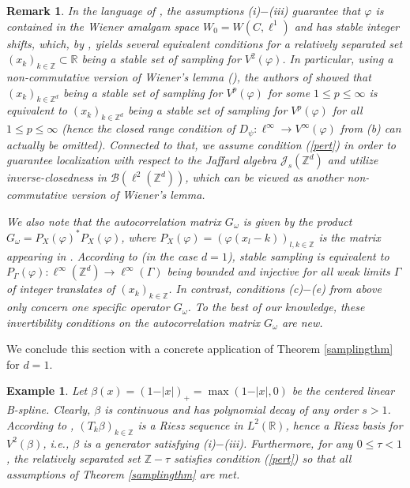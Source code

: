 \documentclass{amsart}
\newtheorem{example}[theorem]{Example}
\newtheorem{rem.}[theorem]{Remark}
\newcommand{\B}[0]{{\mathcal{B}}}
\newcommand{\Z}[0]{{\mathbb{Z}}}
\newcommand{\J}[0]{{\mathcal{J}}}
\begin{document}
\begin{rem.}
In the language of \cite{grrost18}, the assumptions (i)$-$(iii) guarantee that $\varphi$ is contained in the Wiener amalgam space $W_0 = W(C,\ell^1)$ and has \emph{stable integer shifts}, which, by \cite[Theorem~3.1]{grrost18}, yields several equivalent conditions for a relatively separated set $(x_k)_{k\in \Z} \subset \mathbb{R}$ being a stable set of sampling for $V^2(\varphi)$. In particular, using a non-commutative version of Wiener's lemma (\cite[Proposition~8.1]{GROCHENIG2015388}), the authors of \cite{grrost18} showed that $(x_k)_{k\in \Z^d}$ being a stable set of sampling for $V^p(\varphi)$ for \emph{some} $1\leq p \leq \infty$ is equivalent to $(x_k)_{k\in \Z^d}$ being a stable set of sampling for $V^p(\varphi)$ for \emph{all} $1\leq p \leq \infty$ (hence the closed range condition of $D_{\psi}:\ell^{\infty} \to V^{\infty}(\varphi)$ from (b) can actually be omitted). Connected to that, we assume condition (\ref{pert}) in order to guarantee localization with respect to the Jaffard algebra $\J_s(\mathbb{Z}^d)$ and utilize inverse-closedness in $\B(\ell^2(\mathbb{Z}^d))$, which can be viewed as another non-commutative version of Wiener's lemma. 

We also note that the autocorrelation matrix $G_\omega$ is given by the product $G_\omega = P_X(\varphi)^* P_X(\varphi)$, where $P_X(\varphi) = (\varphi(x_l -k))_{l,k\in \Z}$ is the matrix appearing in \cite[Theorem~3.1]{grrost18}. According to \cite[Theorem~3.1]{grrost18} (in the case $d=1$), stable sampling is equivalent to $P_\Gamma(\varphi):\ell^{\infty}(\mathbb{Z}^d) \to \ell^{\infty}(\Gamma)$ being bounded and injective for \emph{all} weak limits $\Gamma$ of integer translates of $(x_k)_{k\in \Z}$. In contrast, conditions (c)$-$(e) from above only concern \emph{one} specific operator $G_\omega$. To the best of our knowledge, these invertibility conditions on the autocorrelation matrix $G_\omega$ are new.
\end{rem.}

We conclude this section with a concrete application of Theorem \ref{samplingthm} for $d=1$.

\begin{example}\label{Bsplineex}
Let $\beta(x) = (1-\vert x \vert)_+ = \max(1-\vert x \vert, 0)$ be the centered linear B-spline. Clearly, $\beta$ is continuous and has polynomial decay of any order $s>1$. According to \cite[Theorem~9.2.6]{ole1n}, $(T_k \beta)_{k\in \mathbb{Z}}$ is a Riesz sequence in $L^2(\mathbb{R})$, hence a Riesz basis for $V^2(\beta)$, i.e., $\beta$ is a generator satisfying (i)$-$(iii). Furthermore, for any $0\leq \tau <1$, the relatively separated set $\mathbb{Z} - \tau$ satisfies condition (\ref{pert}) so that all assumptions of Theorem \ref{samplingthm} are met.

\end{example}
\end{document}
